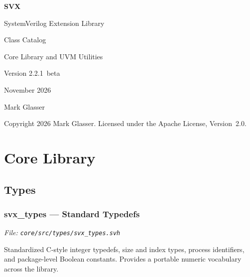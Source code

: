 \documentclass[11pt,letterpaper]{report}
\begin{document}
\begin{titlepage}
  \centering
  \vspace*{2cm}
  {\Huge\bfseries SVX\par}
  \vspace{0.5em}
  {\Large SystemVerilog Extension Library\par}
  \vspace{1.5em}
  {\huge Class Catalog\par}
  \vspace{0.5em}
  {\large Core Library and UVM Utilities\par}
  \vspace{2em}
  {\large Version 2.2.1~beta\par}
  \vspace{0.5em}
  {\large November 2026\par}
  \vspace{0.5em}
  {\large Mark Glasser\par}
  \vfill
  {\small Copyright 2026 Mark Glasser.
  Licensed under the Apache License, Version~2.0.\par}
\end{titlepage}
\tableofcontents

\part{Core Library}

\chapter{Types}
\section{svx\_types --- Standard Typedefs}
\noindent\small\textit{File: \texttt{core/src/types/svx\_types.svh}}\par

Standardized C-style integer typedefs, size and index types, process identifiers, and package-level Boolean constants. Provides a portable numeric vocabulary across the library.
\end{document}
